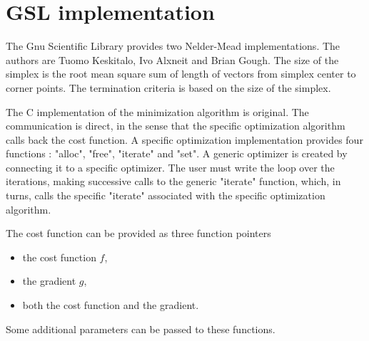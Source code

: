 \section{GSL implementation}

The Gnu Scientific Library provides two Nelder-Mead implementations.
The authors are Tuomo Keskitalo, Ivo Alxneit and Brian Gough.
The size of the simplex is the root mean square sum of length of vectors 
from simplex center to corner points.
The termination criteria is based on the size of the simplex.

The C implementation of the minimization algorithm is original.
The communication is direct, in the sense that the specific optimization 
algorithm calls back the cost function.
A specific optimization implementation provides four functions : "alloc", "free", "iterate"
and "set". A generic optimizer is created by connecting it to a specific optimizer.
The user must write the loop over the iterations, making successive calls 
to the generic "iterate" function, which, in turns, calls the specific "iterate" 
associated with the specific optimization algorithm. 

The cost function can be provided as three function pointers 
\begin{itemize}
\item the cost function $f$,
\item the gradient $g$,
\item both the cost function and the gradient.
\end{itemize}
Some additional parameters can be passed to these functions.


